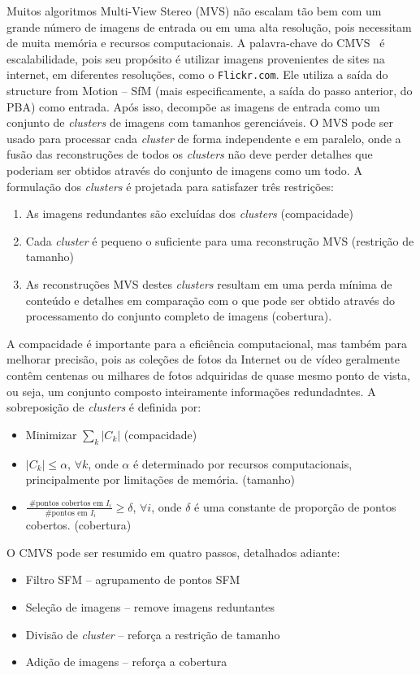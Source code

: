 Muitos algoritmos Multi-View Stereo (MVS) não escalam tão bem com um grande
número de imagens de entrada ou em uma alta resolução, pois necessitam de muita
memória e recursos computacionais. A palavra-chave do
CMVS~\cite{visualSfMPMVS,wu2013towards,li2013improving} é escalabilidade, pois
seu propósito é utilizar imagens provenientes de sites na internet, em
diferentes resoluções, como o \texttt{Flickr.com}.  Ele utiliza a saída do structure from
Motion -- SfM (mais especificamente, a saída do passo anterior, do PBA) 
como entrada. Após isso, decompõe as imagens de entrada como um conjunto de
\emph{clusters} de imagens com tamanhos gerenciáveis. O MVS pode ser usado para
processar cada \emph{cluster} de forma independente e em paralelo, onde a fusão
das reconstruções de todos os \emph{clusters} não deve perder detalhes que
poderiam ser obtidos através do conjunto de imagens como um todo.
A formulação dos \emph{clusters} é projetada para satisfazer três restrições: 
\begin{enumerate}
\item{As imagens redundantes são excluídas dos \emph{clusters} (compacidade)}
\item{Cada \emph{cluster} é pequeno o suficiente para uma reconstrução MVS (restrição de tamanho)}
\item{As reconstruções MVS destes \emph{clusters} resultam em uma perda mínima de conteúdo e detalhes em comparação com o que pode ser obtido através do processamento do conjunto completo de imagens (cobertura).}
\end{enumerate}
A compacidade é importante para a eficiência computacional, mas também para
melhorar precisão, pois as coleções de fotos da Internet ou de vídeo geralmente
contêm centenas ou milhares de fotos adquiridas de quase mesmo ponto de vista,
ou seja, um conjunto composto inteiramente informações redundadntes.  A
sobreposição de \emph{clusters} é definida por:
\begin{itemize}
\item Minimizar $\sum_{k} |C_k|$ (compacidade)
\item $|C_k| \le \alpha$, $\forall k$, onde $\alpha$ é determinado por recursos computacionais, principalmente por limitações de memória. (tamanho)
\item $\frac{\text{ \# pontos cobertos em } I_i}{\text{ \# pontos em } I_i} \ge
  \delta$, $\forall i$, onde $\delta$ é uma constante de proporção de pontos cobertos. (cobertura)
\end{itemize}
O CMVS pode ser resumido em quatro passos, detalhados adiante:
\begin{itemize}
\item Filtro SFM -- agrupamento de pontos SFM
\item Seleção de imagens -- remove imagens reduntantes
\item Divisão de \emph{cluster} -- reforça a restrição de tamanho
\item Adição de imagens -- reforça a cobertura
\end{itemize}

